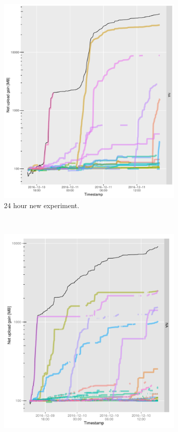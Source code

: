 \begin{figure}[h]
	\begin{adjustwidth}{-1.5cm}{}
		\begin{subfigure}[t]{0.6\textwidth}
			\centering
			\includegraphics[width=\textwidth]{pics/results/b136.pdf}
			\caption{24 hour new experiment.}
			\label{fig:newetree24}
		\end{subfigure}
		~
		\begin{subfigure}[t]{0.6\textwidth}
			\centering
			\includegraphics[width=\textwidth]{pics/results/m138.pdf}

\end{subfigure}
\end{adjustwidth}
\end{figure}
